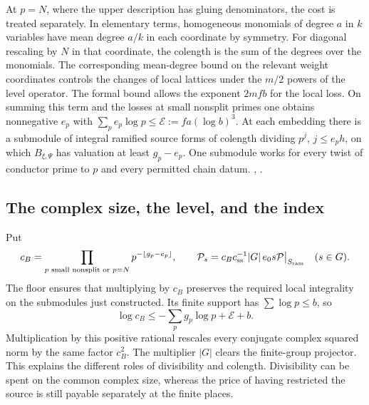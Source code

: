 At \(p=N\), where the upper description has gluing denominators, the cost is treated separately. In elementary terms, homogeneous monomials of degree \(a\) in \(k\) variables have mean degree \(a/k\) in each coordinate by symmetry. For diagonal rescaling by \(N\) in that coordinate, the colength is the sum of the degrees over the monomials. The corresponding mean-degree bound on the relevant weight coordinates controls the changes of local lattices under the \(m/2\) powers of the level operator. The formal bound allows the exponent \(2mfb\) for the local loss. On summing this term and the losses at small nonsplit primes one obtains nonnegative \(e_p\) with \(\sum_p e_p\log p\le \mathcal E:=fa(\log b)^3\). At each embedding there is a submodule of integral ramified source forms of colength dividing \(p^j\), \(j\le e_p h\), on which \(B_{\xi,\Psi}\) has valuation at least \(g_p-e_p\). One submodule works for every twist of conductor prime to \(p\) and every permitted chain datum. , .

\subsection{The complex size, the level, and the index}

Put
\[
 c_B=\prod_{p\text{ small nonsplit or }p=N}p^{-\lfloor g_p-e_p\rfloor},
 \qquad \mathcal P_s=c_B c_{\rm ss}^{-1}|G|\,e_0s\mathcal P
                      \big|_{S_{\rm ram}}\quad (s\in G).
\]
The floor ensures that multiplying by \(c_B\) preserves the required local integrality on the submodules just constructed. Its finite support has \(\sum\log p\le b\), so
\[
            \log c_B\le -\sum_p g_p\log p+\mathcal E+b.
\]
Multiplication by this positive rational rescales every conjugate complex squared norm by the same factor \(c_B^2\). The multiplier \(|G|\) clears the finite-group projector. This explains the different roles of divisibility and colength. Divisibility can be spent on the common complex size, whereas the price of having restricted the source is still payable separately at the finite places.

